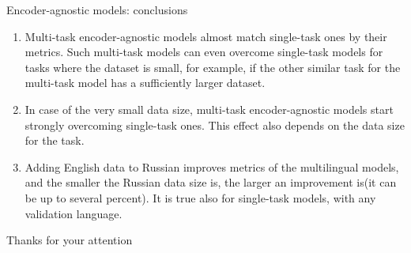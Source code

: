 \begin{frame}{Encoder-agnostic models: conclusions}
\begin{enumerate}
\item Multi-task encoder-agnostic models almost match single-task ones by their metrics. Such multi-task models can even overcome single-task models for tasks where the dataset is small, for example, if the other similar task for the multi-task model has a sufficiently larger dataset. 
\item In case of the very small data size, multi-task encoder-agnostic models start strongly overcoming single-task ones. This effect also depends on the data size for the task. 
\item Adding English data to Russian improves metrics of the multilingual models, and the smaller the Russian data size is, the larger an improvement is(it can be up to several percent). It is true also for single-task models, with any validation language.
\end{enumerate}
\end{frame}

\begin{frame}{Thanks for your attention}
\end{frame}
